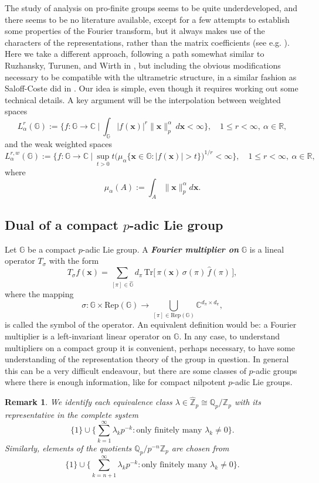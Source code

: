 \documentclass[12pt, reqno]{amsart}
\newtheorem{rem}[defi]{Remark}
\newcommand{\C}{\mathbb{C}}
\newcommand{\1}{\mathds{1}}
\newcommand{\G}{\mathbb{G}}
\begin{document}
The study of analysis on pro-finite groups seems to be quite underdeveloped, and there seems to be no literature available, except for a few attempts to establish some properties of the Fourier transform, but it always makes use of the characters of the representations, rather than the matrix coefficients (see e.g. \cite{Gt2006}). Here we take a different approach, following a path somewhat similar to Ruzhansky, Turunen, and Wirth in \cite{Ruzhansky2010, Ruzhansky2015}, but including the obvious modifications necessary to be compatible with the ultrametric structure, in a similar fashion as Saloff-Coste did in \cite{SaloffCoste1986}. Our idea is simple, even though it requires working out some technical details. A key argument will be the interpolation between weighted spaces
\[
L^r_\alpha (\mathbb{G}) := \Big\{ f : \mathbb{G} \to \mathbb{C} \ \Big| \ \int_{\mathbb{G}} |f(\mathbf{x})|^r \|\mathbf{x}\|_p^\alpha \, d\mathbf{x} < \infty \Big\}, \quad 1 \le r < \infty, \ \alpha \in \mathbb{R},
\]
and the weak weighted spaces
\[
L^{r,w}_{\alpha}(\mathbb{G}) := \Big\{ f : \mathbb{G} \to \mathbb{C} \ \Big| \ \sup_{t>0} t \big(\mu_\alpha\{ \mathbf{x} \in \mathbb{G} : |f(\mathbf{x})| > t \}\big)^{1/r} < \infty \Big\}, \quad 1 \le r < \infty, \ \alpha \in \mathbb{R},
\]
where $$ \mu_\alpha (A):= \int_A \| \mathbf{x} \|_p^\alpha d \mathbf{x} .$$

\subsection{Dual of a compact $p$-adic Lie group} 
Let $\G$ be a compact $p$-adic Lie group. A \emph{\textbf{Fourier multiplier on}} $\G$ is a lineal operator $T_\sigma$ with the form \[
T_\sigma f(\mathbf{x})= \sum_{[\pi] \in \widehat{\G}} d_{\pi}\,\mathrm{Tr}\big[\,\pi(\mathbf{x})\,\sigma(\pi)\,\widehat{f}(\pi)\,\big],
\]where the mapping $$\sigma : \G \times \mathrm{Rep}(\G) \to \bigcup_{[\pi] \in \mathrm{Rep}(\G)} \C^{d_\pi \times d_\pi},$$is called the symbol of the operator. An equivalent definition would be: a Fourier multiplier is a left-invariant linear operator on $\G$. In any case, to understand multipliers on a compact group it is convenient, perhaps necessary, to have some understanding of the representation theory of the group in question. In general this can be a very difficult endeavour, but there are some classes of $p$-adic groups where there is enough information, like for compact nilpotent $p$-adic Lie groups.

\begin{rem}\label{remnotationdualofZp}
We identify each equivalence class $\lambda \in \widehat{\mathbb{Z}}_p \cong \mathbb{Q}_p / \mathbb{Z}_p$ with its representative in the complete system
\[
\{1\} \cup \Big\{ \sum_{k=1}^{\infty} \lambda_k p^{-k} : \text{only finitely many } \lambda_k \neq 0 \Big\}.
\]
Similarly, elements of the quotients $\mathbb{Q}_p / p^{-n} \mathbb{Z}_p$ are chosen from
\[
\{1\} \cup \Big\{ \sum_{k=n+1}^{\infty} \lambda_k p^{-k} : \text{only finitely many } \lambda_k \neq 0 \Big\}.
\]
\end{rem}
\end{document}
